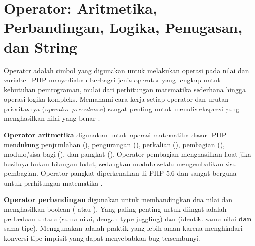 \section{Operator: Aritmetika, Perbandingan, Logika, Penugasan, dan String}

Operator adalah simbol yang digunakan untuk melakukan operasi pada nilai dan variabel. PHP menyediakan berbagai jenis operator yang lengkap untuk kebutuhan pemrograman, mulai dari perhitungan matematika sederhana hingga operasi logika kompleks. Memahami cara kerja setiap operator dan urutan prioritasnya (\textit{operator precedence}) sangat penting untuk menulis ekspresi yang menghasilkan nilai yang benar \cite{phpManual}.

\textbf{Operator aritmetika} digunakan untuk operasi matematika dasar. PHP mendukung penjumlahan (\code{+}), pengurangan (\code{-}), perkalian (\code{*}), pembagian (\code{/}), modulo/sisa bagi (\code{\%}), dan pangkat (\code{**}). Operator pembagian \code{/} menghasilkan float jika hasilnya bukan bilangan bulat, sedangkan modulo selalu mengembalikan sisa pembagian. Operator pangkat \code{**} diperkenalkan di PHP 5.6 dan sangat berguna untuk perhitungan matematika \cite{w3schoolsPhp}.

\textbf{Operator perbandingan} digunakan untuk membandingkan dua nilai dan menghasilkan boolean ( atau ). Yang paling penting untuk diingat adalah perbedaan antara \code{==} (sama nilai, dengan type juggling) dan \code{===} (identik: sama nilai \textbf{dan} sama tipe). Menggunakan \code{===} adalah praktik yang lebih aman karena menghindari konversi tipe implisit yang dapat menyebabkan bug tersembunyi.

